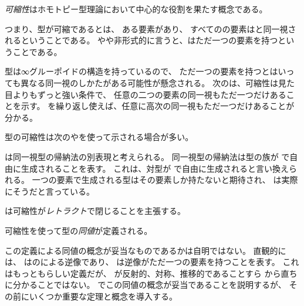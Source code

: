 \documentclass[index]{subfiles}
\begin{document}

\emph{可縮性}はホモトピー型理論において中心的な役割を果たす概念である。



つまり、型が可縮であるとは、
ある要素があり、
すべてのの要素は\myInlineMath{\myCenter}と同一視されるということである。
やや非形式的に言うと、はただ一つの要素を持つということである。



型は∞グルーポイドの構造を持っているので、
ただ一つの要素を持つとはいっても異なる同一視のしかたがある可能性が懸念される。
次のは、可縮性は見た目よりもずっと強い条件で、
任意の二つの要素の同一視もただ一つだけあることを示す。
を繰り返し使えば、任意に高次の同一視もただ一つだけあることが分かる。



型の可縮性は次のやを使って示される場合が多い。



は同一視型の帰納法の別表現と考えられる。
同一視型の帰納法は型の族が
で自由に生成されることを表す。
これは、対型が
で自由に生成されると言い換えられる。
一つの要素で生成される型はその要素しか持たないと期待され、
は実際にそうだと言っている。

は可縮性が\emph{レトラクト}で閉じることを主張する。




可縮性を使って型の\emph{同値}が定義される。





この定義による同値の概念が妥当なものであるかは自明ではない。
直観的には、
はのによる逆像であり、
は逆像がただ一つの要素を持つことを表す。
これはもっともらしい定義だが、
\myInlineMath{\myEquiv}が反射的、対称、推移的であることすら
から直ちに分かることではない。
でこの同値の概念が妥当であることを説明するが、
その前にいくつか重要な定理と概念を導入する。
\end{document}
